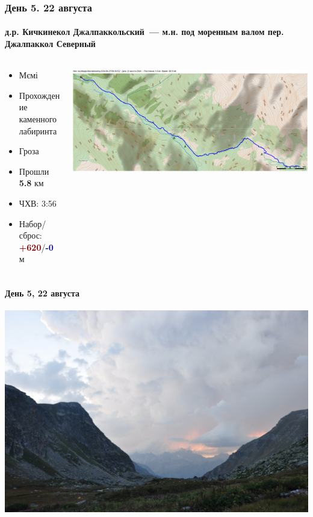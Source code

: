 	\begin{frame}
	\frametitle{День 5. 22 августа}
	\framesubtitle{д.р. Кичкинекол Джалпаккольский~--- м.н. под моренным валом пер. Джалпаккол Северный} %
	\begin{columns}[c] %
		\begin{column}{0.45\textwidth} %
			\begin{itemize}
				\item Мємі
				\item Прохождение каменного лабиринта
				\item Гроза
				\item Прошли \textbf{5.8} км
				\item ЧХВ: 3:56
				\item Набор/сброс: \textcolor{darkred}{\textbf{+620}}/\textcolor{darkblue}{\textbf{-0}}~м
			\end{itemize}
			
		\end{column}
		\begin{column}{0.5\textwidth} %
			\centering
			\includegraphics[width=\linewidth]{../pics/mini_maps/22}
		\end{column}
	\end{columns}
\end{frame}

\begin{frame}
	\frametitle{\textAlpha\textpi \textomikron\textkappa\textalpha\textlambda\textnu\textpsi\textiota\textvarsigma}
	\framesubtitle{День 5, 22 августа}
	\centering
	\includegraphics[width=\textwidth]{../pics/DSC_0010}			
\end{frame}
